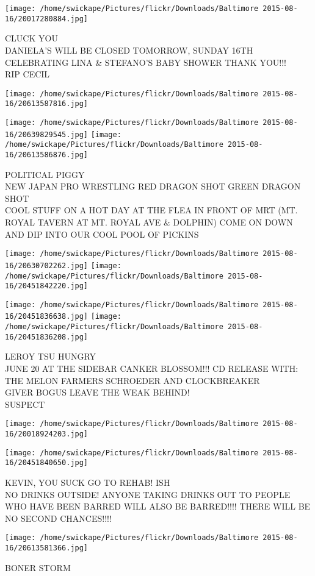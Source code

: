 \documentclass[10pt,letterpaper]{article}
\begin{document}
\vspace{0.25in}
\texttt{[image: /home/swickape/Pictures/flickr/Downloads/Baltimore 2015-08-16/20017280884.jpg]}

CLUCK YOU\\
DANIELA'S WILL BE CLOSED TOMORROW, SUNDAY 16TH CELEBRATING LINA \& STEFANO'S BABY SHOWER THANK YOU!!!\\
RIP CECIL\\
\pagebreak

\texttt{[image: /home/swickape/Pictures/flickr/Downloads/Baltimore 2015-08-16/20613587816.jpg]}

\vspace{0.25in}
\texttt{[image: /home/swickape/Pictures/flickr/Downloads/Baltimore 2015-08-16/20639829545.jpg]}
\texttt{[image: /home/swickape/Pictures/flickr/Downloads/Baltimore 2015-08-16/20613586876.jpg]}

POLITICAL PIGGY\\
NEW JAPAN PRO WRESTLING RED DRAGON SHOT GREEN DRAGON SHOT\\
COOL STUFF ON A HOT DAY AT THE FLEA IN FRONT OF MRT (MT. ROYAL TAVERN AT MT. ROYAL AVE \& DOLPHIN) COME ON DOWN AND DIP INTO OUR COOL POOL OF PICKINS\\
\pagebreak

\texttt{[image: /home/swickape/Pictures/flickr/Downloads/Baltimore 2015-08-16/20630702262.jpg]}
\texttt{[image: /home/swickape/Pictures/flickr/Downloads/Baltimore 2015-08-16/20451842220.jpg]}

\texttt{[image: /home/swickape/Pictures/flickr/Downloads/Baltimore 2015-08-16/20451836638.jpg]}
\texttt{[image: /home/swickape/Pictures/flickr/Downloads/Baltimore 2015-08-16/20451836208.jpg]}

LEROY TSU HUNGRY\\
JUNE 20 AT THE SIDEBAR CANKER BLOSSOM!!! CD RELEASE WITH: THE MELON FARMERS SCHROEDER AND CLOCKBREAKER\\
GIVER BOGUS LEAVE THE WEAK BEHIND!\\
SUSPECT\\
\pagebreak

\texttt{[image: /home/swickape/Pictures/flickr/Downloads/Baltimore 2015-08-16/20018924203.jpg]}

\vspace{0.25in}
\texttt{[image: /home/swickape/Pictures/flickr/Downloads/Baltimore 2015-08-16/20451840650.jpg]}

KEVIN, YOU SUCK GO TO REHAB! ISH\\
NO DRINKS OUTSIDE!  ANYONE TAKING DRINKS OUT TO PEOPLE WHO HAVE BEEN BARRED WILL ALSO BE BARRED!!!! THERE WILL BE NO SECOND CHANCES!!!!\\
\pagebreak

\texttt{[image: /home/swickape/Pictures/flickr/Downloads/Baltimore 2015-08-16/20613581366.jpg]}

BONER STORM\\
\pagebreak
\end{document}
